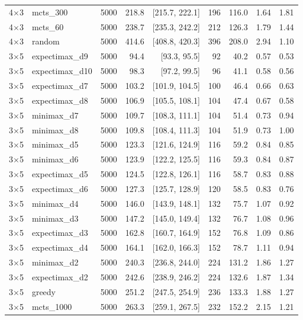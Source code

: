 {\begin{longtable}{llrrrrrrr}
4$\times$3 & mcts\_300 & 5000 & 218.8 & [215.7, 222.1] & 196 & 116.0 & 1.64 & 1.81 \\
4$\times$3 & mcts\_60 & 5000 & 238.7 & [235.3, 242.2] & 212 & 126.3 & 1.79 & 1.44 \\
4$\times$3 & random & 5000 & 414.6 & [408.8, 420.3] & 396 & 208.0 & 2.94 & 1.10 \\
\midrule
3$\times$5 & expectimax\_d9 & 5000 & 94.4 & [93.3, 95.5] & 92 & 40.2 & 0.57 & 0.53 \\
3$\times$5 & expectimax\_d10 & 5000 & 98.3 & [97.2, 99.5] & 96 & 41.1 & 0.58 & 0.56 \\
3$\times$5 & expectimax\_d7 & 5000 & 103.2 & [101.9, 104.5] & 100 & 46.4 & 0.66 & 0.63 \\
3$\times$5 & expectimax\_d8 & 5000 & 106.9 & [105.5, 108.1] & 104 & 47.4 & 0.67 & 0.58 \\
3$\times$5 & minimax\_d7 & 5000 & 109.7 & [108.3, 111.1] & 104 & 51.4 & 0.73 & 0.94 \\
3$\times$5 & minimax\_d8 & 5000 & 109.8 & [108.4, 111.3] & 104 & 51.9 & 0.73 & 1.00 \\
3$\times$5 & minimax\_d5 & 5000 & 123.3 & [121.6, 124.9] & 116 & 59.2 & 0.84 & 0.85 \\
3$\times$5 & minimax\_d6 & 5000 & 123.9 & [122.2, 125.5] & 116 & 59.3 & 0.84 & 0.87 \\
3$\times$5 & expectimax\_d5 & 5000 & 124.5 & [122.8, 126.1] & 116 & 58.7 & 0.83 & 0.88 \\
3$\times$5 & expectimax\_d6 & 5000 & 127.3 & [125.7, 128.9] & 120 & 58.5 & 0.83 & 0.76 \\
3$\times$5 & minimax\_d4 & 5000 & 146.0 & [143.9, 148.1] & 132 & 75.7 & 1.07 & 0.92 \\
3$\times$5 & minimax\_d3 & 5000 & 147.2 & [145.0, 149.4] & 132 & 76.7 & 1.08 & 0.96 \\
3$\times$5 & expectimax\_d3 & 5000 & 162.8 & [160.7, 164.9] & 152 & 76.8 & 1.09 & 0.86 \\
3$\times$5 & expectimax\_d4 & 5000 & 164.1 & [162.0, 166.3] & 152 & 78.7 & 1.11 & 0.94 \\
3$\times$5 & minimax\_d2 & 5000 & 240.3 & [236.8, 244.0] & 224 & 131.2 & 1.86 & 1.27 \\
3$\times$5 & expectimax\_d2 & 5000 & 242.6 & [238.9, 246.2] & 224 & 132.6 & 1.87 & 1.34 \\
3$\times$5 & greedy & 5000 & 251.2 & [247.5, 254.9] & 236 & 133.3 & 1.88 & 1.27 \\
3$\times$5 & mcts\_1000 & 5000 & 263.3 & [259.1, 267.5] & 232 & 152.2 & 2.15 & 1.21 \\

\end{longtable}}
